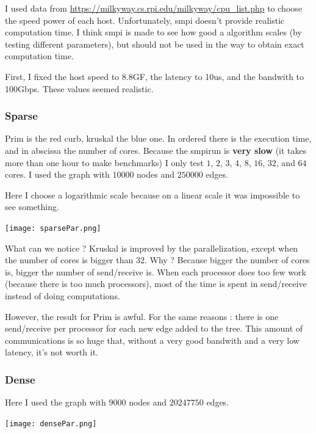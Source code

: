 \documentclass[a4paper, 10pt]{article}
\begin{document}
I used data from \url{https://milkyway.cs.rpi.edu/milkyway/cpu_list.php} to choose the speed power of each host. Unfortunately, smpi doesn't provide realistic computation time. I think smpi is made to see how good a algorithm scales (by testing different parameters), but should not be used in the way to obtain exact computation time.  
  
First, I fixed the host speed to 8.8GF, the latency to 10us, and the bandwith to 100Gbps. These values seemed realistic.  
  
\subsubsection{Sparse}  
  
Prim is the red curb, kruskal the blue one. In ordered there is the execution time, and in abscissa the number of cores. Because the smpirun is \textbf{very slow} (it takes more than one hour to make benchmarks) I only test $1$, $2$, $3$, $4$, $8$, $16$, $32$, and $64$ cores. I used the graph with $10000$ nodes and $250000$ edges.  
  
Here I choose a logarithmic scale because on a linear scale it was impossible to see something.  
  
\begin{center}
\texttt{[image: sparsePar.png]}  
\end{center}
  
What can we notice ? Kruskal is improved by the parallelization, except when the number of cores is bigger than $32$. Why ? Because bigger the number of cores is, bigger the number of send/receive is. When each processor does too few work (because there is too much processors), most of the time is spent in send/receive instead of doing computations.  
  
However, the result for Prim is awful. For the same reasons : there is one send/receive per processor for each new edge added to the tree. This amount of communications is so huge that, without a very good bandwith and a very low latency, it's not worth it.  
  
\subsubsection{Dense}  
  
Here I used the graph with $9000$ nodes and $20247750$ edges.  
  
\begin{center}
\texttt{[image: densePar.png]}  
\end{center}
  
\end{document}
